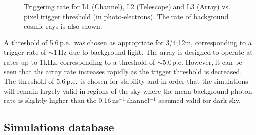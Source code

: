 \begin{figure}[t]
\begin{minipage}{\textwidth}
\hspace*{\fill}
\hspace*{\fill}
\end{minipage}
\caption{\label{FIG::VERITAS::NSB} Triggering rate for L1 (Channel), 
L2 (Telescope) and L3 (Array) vs. pixel trigger threshold (in photo-electrons).
The rate of background cosmic-rays is also shown.}
\end{figure}

A threshold of 5.6\,p.e.\ was chosen as appropriate for 3/4;12m,
corresponding to a trigger rate of $\sim$1\,Hz due to background
light. The array is designed to operate at rates up to 1\,kHz,
corresponding to a threshold of $\sim$5.0\,p.e. However, it can be
seen that the array rate increases rapidly as the trigger threshold is
decreased. The threshold of 5.6\,p.e.\ is chosen for stability and in
order that the simulations will remain largely valid in regions of the
sky where the mean background photon rate is slightly higher than
the 0.16\,ns$^{-1}$\,channel$^{-1}$ assumed valid for dark sky.

\subsection{Simulations database}
\label{SEC::VERITAS::V4SIMULATIONS}

